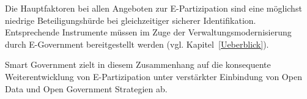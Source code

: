 Die Hauptfaktoren bei allen Angeboten zur E-Partizipation sind eine möglichst niedrige Beteiligungshürde bei gleichzeitiger sicherer Identifikation.
Entsprechende Instrumente müssen im Zuge der Verwaltungsmodernisierung durch E-Government bereitgestellt werden (vgl. Kapitel~\ref{Ueberblick}).

Smart Government zielt in diesem Zusammenhang auf die konsequente Weiterentwicklung von E-Partizipation unter verstärkter Einbindung von Open Data und Open Government Strategien ab.






